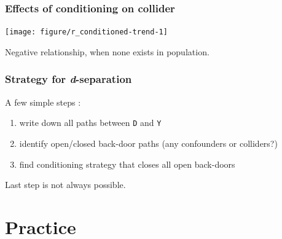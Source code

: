 \documentclass[12pt,english,dvipsnames,aspectratio=169,handout]{beamer}\usepackage[]{graphicx}\usepackage[]{xcolor}
\newenvironment{knitrout}{}{} %
\begin{document}
\begin{frame}
  \frametitle{Effects of conditioning on collider}
  
\begin{knitrout}
\color{fgcolor}

{\centering \texttt{[image: figure/r\_conditioned-trend-1]} 

}


\end{knitrout}

Negative relationship, when none exists in population.
  
\end{frame}


\begin{frame}
	\frametitle{Strategy for \textit{d}-separation}
	A few simple steps \cite[p.~73]{cunningham_causal_2021}:
	
	\begin{enumerate}
		\item write down all paths between \texttt{D} and \texttt{Y}
		
		\item identify open/closed back-door paths (any confounders or colliders?)
		
		\item find conditioning strategy that closes all open back-doors
	\end{enumerate}
	
	Last step is not always possible.
		
\end{frame}


\section{Practice}
\end{document}
